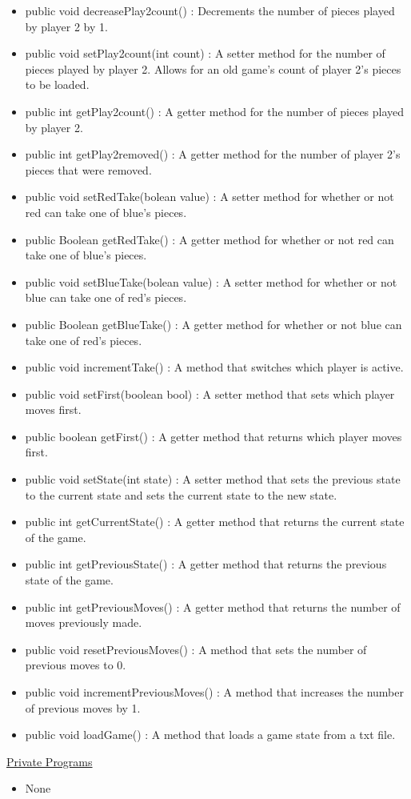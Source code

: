 \documentclass[12pt]{article}
\begin{document}
\begin{itemize}
\begin{itemize}
			\item public void decreasePlay2count() : Decrements the number of pieces played by player 2 by 1.
			\item public void setPlay2count(int count) : A setter method for the number of pieces played by player 2. Allows for an old game’s count of player 2’s pieces to be loaded.
			\item public int getPlay2count() : A getter method for the number of pieces played by player 2.
			\item public int getPlay2removed() : A getter method for the number of player 2’s pieces that were removed.
			\item public void setRedTake(bolean value) : A setter method for whether or not red can take one of blue’s pieces.
			\item public Boolean getRedTake() : A getter method for whether or not red can take one of blue’s pieces.
			\item public void setBlueTake(bolean value) : A setter method for whether or not blue can take one of red’s pieces.
			\item public Boolean getBlueTake() : A getter method for whether or not blue can take one of red’s pieces.
			\item public void incrementTake() : A method that switches which player is active.
			\item public void setFirst(boolean bool) : A setter method that sets which player moves first.
			\item public boolean getFirst() : A getter method that returns which player moves first.
			\item public void setState(int state) : A setter method that sets the previous state to the current state and sets the current state to the new state.
			\item public int getCurrentState() : A getter method that returns the current state of the game.
			\item public int getPreviousState() : A getter method that returns the previous state of the game.
			\item public int getPreviousMoves() : A getter method that returns the number of moves previously made.
			\item public void resetPreviousMoves() : A method that sets the number of previous moves to 0.
			\item public void incrementPreviousMoves() : A method that increases the number of previous moves by 1.
			\item public void loadGame() : A method that loads a game state from a txt file.
			
		\end{itemize}
		\underline{Private Programs}
		\begin{itemize}
			\item None
		\end{itemize}
		
		
	
	
	\end{itemize}
\end{document}
